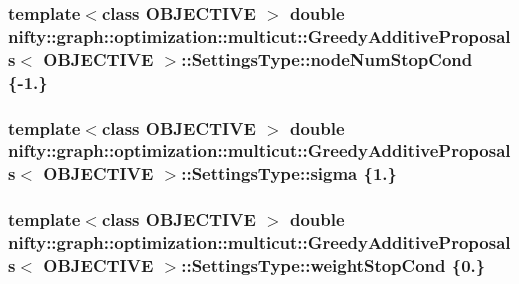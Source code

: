 \subsubsection[{node\+Num\+Stop\+Cond}]{\setlength{\rightskip}{0pt plus 5cm}template$<$class O\+B\+J\+E\+C\+T\+I\+V\+E $>$ double {\bf nifty\+::graph\+::optimization\+::multicut\+::\+Greedy\+Additive\+Proposals}$<$ O\+B\+J\+E\+C\+T\+I\+V\+E $>$\+::Settings\+Type\+::node\+Num\+Stop\+Cond \{-\/1.\}}\label{structnifty_1_1graph_1_1optimization_1_1multicut_1_1GreedyAdditiveProposals_1_1SettingsType_ae750a2bbe36249f9535d3654b0f99bc3}
\hypertarget{structnifty_1_1graph_1_1optimization_1_1multicut_1_1GreedyAdditiveProposals_1_1SettingsType_ac9d869a5abb42f4d2ca8a225ff7ca108}{}
\subsubsection[{sigma}]{\setlength{\rightskip}{0pt plus 5cm}template$<$class O\+B\+J\+E\+C\+T\+I\+V\+E $>$ double {\bf nifty\+::graph\+::optimization\+::multicut\+::\+Greedy\+Additive\+Proposals}$<$ O\+B\+J\+E\+C\+T\+I\+V\+E $>$\+::Settings\+Type\+::sigma \{1.\}}\label{structnifty_1_1graph_1_1optimization_1_1multicut_1_1GreedyAdditiveProposals_1_1SettingsType_ac9d869a5abb42f4d2ca8a225ff7ca108}
\hypertarget{structnifty_1_1graph_1_1optimization_1_1multicut_1_1GreedyAdditiveProposals_1_1SettingsType_ac9178ee3d08c5c53f720cf2f93dd5c47}{}
\subsubsection[{weight\+Stop\+Cond}]{\setlength{\rightskip}{0pt plus 5cm}template$<$class O\+B\+J\+E\+C\+T\+I\+V\+E $>$ double {\bf nifty\+::graph\+::optimization\+::multicut\+::\+Greedy\+Additive\+Proposals}$<$ O\+B\+J\+E\+C\+T\+I\+V\+E $>$\+::Settings\+Type\+::weight\+Stop\+Cond \{0.\}}\label{structnifty_1_1graph_1_1optimization_1_1multicut_1_1GreedyAdditiveProposals_1_1SettingsType_ac9178ee3d08c5c53f720cf2f93dd5c47}


